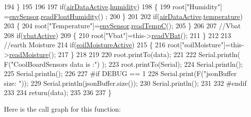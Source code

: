 \begin{DoxyCode}
194     \}
195     
196         
197     \textcolor{keywordflow}{if}(\hyperlink{class_cool_board_sensors_abff8dfeccb2f7689847bb64d5f1cd31e}{airDataActive}.\hyperlink{struct_cool_board_sensors_1_1air_active_ae5740445054b27415e22f450576accb7}{humidity}) 
198     \{   
199         root[\textcolor{stringliteral}{"Humidity"}] =\hyperlink{class_cool_board_sensors_a868e38985e9a2412829fa2790ca13e2e}{envSensor}.\hyperlink{class_b_m_e280_a42ea7232039eebf5aadb391ef6132c35}{readFloatHumidity}() ;
200     \}   
201     
202     \textcolor{keywordflow}{if}(\hyperlink{class_cool_board_sensors_abff8dfeccb2f7689847bb64d5f1cd31e}{airDataActive}.\hyperlink{struct_cool_board_sensors_1_1air_active_a9a6633c426b0508e30ebc1832ec6d745}{temperature})
203     \{
204         root[\textcolor{stringliteral}{"Temperature"}]=\hyperlink{class_cool_board_sensors_a868e38985e9a2412829fa2790ca13e2e}{envSensor}.\hyperlink{class_b_m_e280_afffdd1d7ded9e1f92200e70669019d97}{readTempC}();
205     \}
206     
207     \textcolor{comment}{//Vbat}
208     \textcolor{keywordflow}{if}(\hyperlink{class_cool_board_sensors_af5039ad760b0ff0aa7eee16c55e81702}{vbatActive})    
209     \{   
210         root[\textcolor{stringliteral}{"Vbat"}]=this->\hyperlink{class_cool_board_sensors_a6944b6ea7bce8e2fce1b434acfd9d5f3}{readVBat}();
211     \}
212     
213     \textcolor{comment}{//earth Moisture}
214     \textcolor{keywordflow}{if}(\hyperlink{class_cool_board_sensors_a31983eecc0f9cd000e1f912206ea4dc8}{soilMoistureActive})
215     \{   
216         root[\textcolor{stringliteral}{"soilMoisture"}]=this->\hyperlink{class_cool_board_sensors_a8761bff50373c485f4465c8db47d0633}{readMoisture}();
217     \}
218     
219     
220     root.printTo(data);
221 
222     Serial.println( F(\textcolor{stringliteral}{"CoolBoardSensors data is :"}) );
223     root.printTo(Serial);
224     Serial.println();
225     Serial.println();
226 
227 \textcolor{preprocessor}{#if DEBUG == 1}
228     Serial.print(F(\textcolor{stringliteral}{"jsonBuffer size: "}));
229     Serial.println(jsonBuffer.size());
230     Serial.println();
231 
232 \textcolor{preprocessor}{#endif}
233 
234     \textcolor{keywordflow}{return}(data);   
235     
236 
237 \}
\end{DoxyCode}
Here is the call graph for this function\+:\nopagebreak
